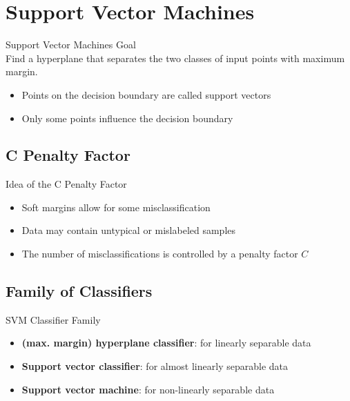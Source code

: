 \section{Support Vector Machines}

\begin{definition}{Support Vector Machines Goal}\\
Find a hyperplane that separates the two classes of input points with maximum margin.
\begin{itemize}
    \item Points on the decision boundary are called support vectors
    \item Only some points influence the decision boundary
\end{itemize}
\end{definition}

\subsection{C Penalty Factor}

\begin{concept}{Idea of the C Penalty Factor}\\
\begin{itemize}
    \item Soft margins allow for some misclassification
    \item Data may contain untypical or mislabeled samples
    \item The number of misclassifications is controlled by a penalty factor $C$
\end{itemize}
\end{concept}


\subsection{Family of Classifiers}

\begin{concept}{SVM Classifier Family}
\begin{itemize}
    \item \textbf{(max. margin) hyperplane classifier}: for linearly separable data
    \item \textbf{Support vector classifier}: for almost linearly separable data
    \item \textbf{Support vector machine}: for non-linearly separable data
\end{itemize}
\end{concept}

